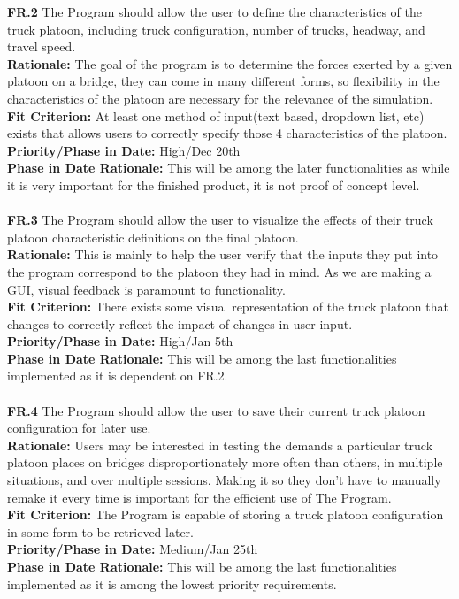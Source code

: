 \documentclass[12pt]{article}
\begin{document}
  \noindent\textbf{FR.2} The Program should allow the user to define the characteristics of the truck platoon, including truck configuration, number of trucks, headway, and travel speed.\\
  \textbf{Rationale:} The goal of the program is to determine the forces exerted by a given platoon on a bridge, they can come in many different forms, so flexibility in the characteristics
  of the platoon are necessary for the relevance of the simulation.\\ 
  \textbf{Fit Criterion:} At least one method of input(text based, dropdown list, etc) exists that allows users to correctly specify those 4 characteristics of the platoon.\\
  \textbf{Priority/Phase in Date:} High/Dec 20th\\
  \textbf{Phase in Date Rationale:} This will be among the later functionalities as while it is very important for the finished product, it is not proof of concept level.\\\\

  \noindent\textbf{FR.3} The Program should allow the user to visualize the effects of their truck platoon characteristic definitions on the final platoon.\\
  \textbf{Rationale:} This is mainly to help the user verify that the inputs they put into the program correspond to the platoon they had in mind. As we are making a GUI,
  visual feedback is paramount to functionality.\\
  \textbf{Fit Criterion:} There exists some visual representation of the truck platoon that changes to correctly reflect the impact of changes in user input.\\
  \textbf{Priority/Phase in Date:} High/Jan 5th\\
  \textbf{Phase in Date Rationale:} This will be among the last functionalities implemented as it is dependent on FR.2.\\\\

  \noindent\textbf{FR.4} The Program should allow the user to save their current truck platoon configuration for later use.\\
  \textbf{Rationale:} Users may be interested in testing the demands a particular truck platoon places on bridges disproportionately more often than others,
   in multiple situations, and over multiple sessions. Making it so they don't have to manually remake it every time is important for the efficient use of The Program.\\
  \textbf{Fit Criterion:} The Program is capable of storing a truck platoon configuration in some form to be retrieved later.\\
  \textbf{Priority/Phase in Date:} Medium/Jan 25th\\
  \textbf{Phase in Date Rationale:} This will be among the last functionalities implemented as it is among the lowest priority requirements.\\\\
\end{document}
